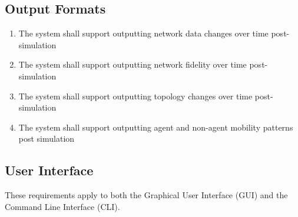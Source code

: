 \documentclass[titlepage]{article}
\begin{document}



\subsection{Output Formats%
  \label{output-formats}%
}

\begin{enumerate}
    \item The system shall support outputting network data changes over time post-simulation
		\item The system shall support outputting network fidelity over time post-simulation
		\item The system shall support outputting topology changes over time post-simulation
		\item The system shall support outputting agent and non-agent mobility patterns post simulation
\end{enumerate}


\subsection{User Interface%
  \label{user-interface}%
}

These requirements apply to both the Graphical User Interface (GUI) and the
Command Line Interface (CLI).
\end{document}
